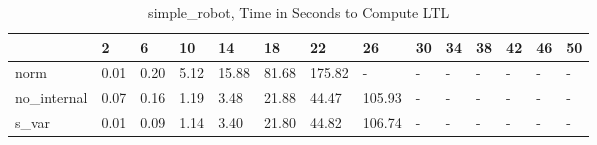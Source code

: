 \begin{table}
\caption{simple_robot, Time in Seconds to Compute LTL}
\label{simple_robot_LTL_time}
\begin{tabular}{llllllllllllll}
\toprule
 & 2 & 6 & 10 & 14 & 18 & 22 & 26 & 30 & 34 & 38 & 42 & 46 & 50 \\
\midrule
norm & 0.01 & 0.20 & 5.12 & 15.88 & 81.68 & 175.82 & - & - & - & - & - & - & - \\
no_internal & 0.07 & 0.16 & 1.19 & 3.48 & 21.88 & 44.47 & 105.93 & - & - & - & - & - & - \\
s_var & 0.01 & 0.09 & 1.14 & 3.40 & 21.80 & 44.82 & 106.74 & - & - & - & - & - & - \\
\bottomrule
\end{tabular}
\end{table}
